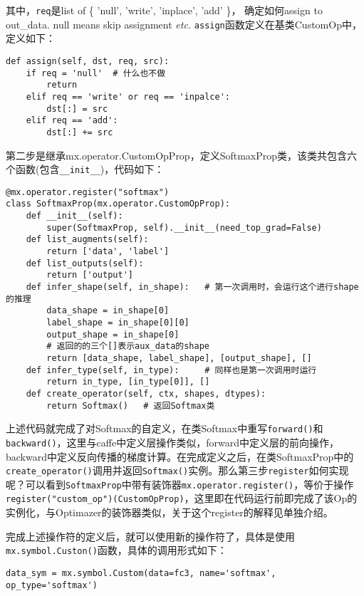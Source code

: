其中，\verb|req|是list of \{ 'null', 'write', 'inplace', 'add'  \}， 确定如何assign to out\_data. null means skip assignment \textit{etc.}  \verb|assign|函数定义在基类CustomOp中，定义如下：

\begin{verbatim}
def assign(self, dst, req, src):
    if req = 'null'  # 什么也不做
        return
    elif req == 'write' or req == 'inpalce':
        dst[:] = src
    elif req == 'add':
        dst[:] += src
\end{verbatim}

第二步是继承mx.operator.CustomOpProp，定义SoftmaxProp类，该类共包含六个函数(包含\verb|__init__|)，代码如下：
\begin{lstlisting}
@mx.operator.register("softmax")
class SoftmaxProp(mx.operator.CustomOpProp):
    def __init__(self):
        super(SoftmaxProp, self).__init__(need_top_grad=False)
    def list_augments(self):  
        return ['data', 'label']
    def list_outputs(self):    
        return ['output']
    def infer_shape(self, in_shape):   # 第一次调用时，会运行这个进行shape的推理
        data_shape = in_shape[0]
        label_shape = in_shape[0][0]
        output_shape = in_shape[0]
        # 返回的的三个[]表示aux_data的shape
        return [data_shape, label_shape], [output_shape], []
    def infer_type(self, in_type):     # 同样也是第一次调用时运行
        return in_type, [in_type[0]], [] 
    def create_operator(self, ctx, shapes, dtypes):
        return Softmax()   # 返回Softmax类
\end{lstlisting}

上述代码就完成了对Softmax的自定义，在类Softmax中重写\verb|forward()|和\verb|backward()|，这里与caffe中定义层操作类似，forward中定义层的前向操作，backward中定义反向传播的梯度计算。在完成定义之后，在类SoftmaxProp中的\verb|create_operator()|调用并返回\verb|Softmax()|实例。那么第三步\verb|register|如何实现呢？可以看到\verb|SoftmaxProp|中带有装饰器\verb|mx.operator.register()|，等价于操作\verb|register("custom_op")(CustomOpProp)|，这里即在代码运行前即完成了该Op的实例化，与Optimazer的装饰器类似，关于这个register的解释见单独介绍。

完成上述操作符的定义后，就可以使用新的操作符了，具体是使用\verb|mx.symbol.Custon()|函数，具体的调用形式如下：
\begin{lstlisting}
data_sym = mx.symbol.Custom(data=fc3, name='softmax', op_type='softmax')
\end{lstlisting}


